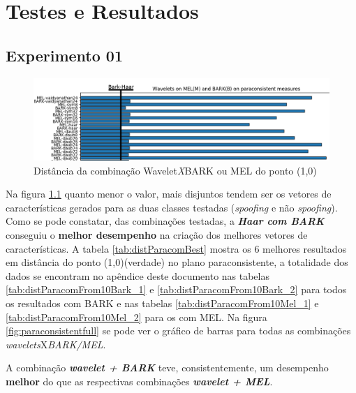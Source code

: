 \chapter{Testes e Resultados} \label{chap:testsResults}
	\begin{myenv}{1.5}
		\section{Experimento 01}
		\begin{figure}[h]
			\centering
			\includegraphics[width=\linewidth]{images/results/paraconsistentPlane/ParaconsistentParcial.png}
			\caption{Distância da combinação Wavelet\textit{X}BARK ou MEL do ponto (1,0)}
			\label{fig:ParaconsistentParcial}
		\end{figure}

		

		\par Na figura \ref{fig:ParaconsistentParcial} quanto menor o valor, mais disjuntos tendem ser os vetores de características gerados para as duas classes testadas (\textit{spoofing }e não \textit{spoofing}). Como se pode constatar, das combinações testadas, a \textit{\textbf{Haar com BARK}} conseguiu o \textbf{melhor desempenho} na criação dos melhores vetores de características. A tabela \ref{tab:distParacomBest} mostra os 6 melhores resultados em distância do ponto (1,0)(verdade) no plano paraconsistente, a totalidade dos dados se encontram no apêndice deste documento nas tabelas \ref{tab:distParacomFrom10Bark_1} e \ref{tab:distParacomFrom10Bark_2} para todos os resultados com BARK e nas tabelas \ref{tab:distParacomFrom10Mel_1} e \ref{tab:distParacomFrom10Mel_2} para os com MEL. Na figura \ref{fig:paraconsistentfull} se pode ver o gráfico de barras para todas as combinações \textit{wavelets}X\textit{BARK/MEL}.
		
		\par A combinação \textbf{\textit{wavelet + BARK}} teve, consistentemente, um desempenho \textbf{melhor} do que as respectivas combinações \textbf{\textit{wavelet + MEL}}.
		

\end{myenv}
